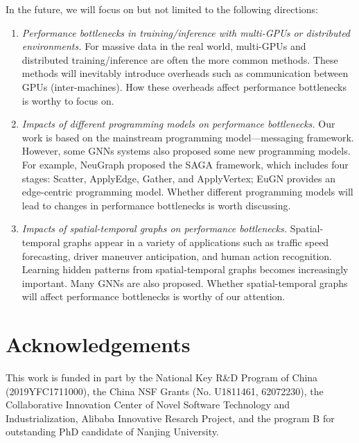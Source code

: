 In the future, we will focus on but not limited to the following directions:
%
\begin{enumerate}
    \item \emph{Performance bottlenecks in training/inference with multi-GPUs or distributed environments.}
    For massive data in the real world, multi-GPUs and distributed training/inference are often the more common methods\cite{zhang2020_analysis_neugraph, zhu2019_aligraph}.
    These methods will inevitably introduce overheads such as communication between GPUs (inter-machines). 
    How these overheads affect performance bottlenecks is worthy to focus on.
    \item \emph{Impacts of different programming models on performance bottlenecks.}
    Our work is based on the mainstream programming model---messaging framework.
    However, some GNNs systems also proposed some new programming models.
    For example, NeuGraph\cite{zhang2020_analysis_neugraph} proposed the SAGA framework, 
    which includes four stages: Scatter, ApplyEdge, Gather, and ApplyVertex;
    EuGN\cite{he2019_EnGN} provides an edge-centric programming model.
    Whether different programming models will lead to changes in performance bottlenecks is worth discussing.
    \item \emph{Impacts of spatial-temporal graphs on performance bottlenecks.}
    Spatial-temporal graphs appear in a variety of applications such as traffic speed forecasting\cite{li2018_DCRNN}, 
    driver maneuver anticipation\cite{jain2016_SRNN}, and human action recognition\cite{yan2018_STGCN}.
    Learning hidden patterns from spatial-temporal graphs becomes increasingly important.
    Many GNNs are also proposed\cite{li2018_DCRNN, jain2016_SRNN, yan2018_STGCN, seo2018_SSGCN, yu2018_STGCN}.
    Whether spatial-temporal graphs will affect performance bottlenecks is worthy of our attention.
\end{enumerate}
\section*{Acknowledgements}

This work is funded in part by the National Key R\&D Program of China (2019YFC1711000), the China NSF Grants (No. U1811461, 62072230), the Collaborative Innovation Center of Novel Software Technology and Industrialization, Alibaba Innovative Resarch Project, and the program B for outstanding PhD candidate of Nanjing University.

